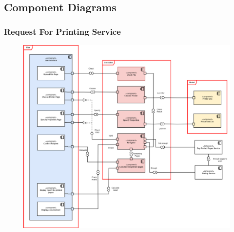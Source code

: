 \newpage
	\subsection{Component Diagrams}
        \subsubsection{Request For Printing Service}
        \begin{center}
        \begin{figure}[!htp]
        \begin{center}
         \includegraphics[scale=0.31]{images/Task3/Component Diagrams/RequestForPrintingService.png}
        \end{center}
        \end{figure}
        \end{center}

